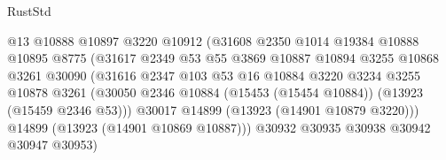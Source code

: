 \begin{lexlean}{RustStd}
\begin{coremodule}
                                        @13
                                        @10888
                                        @10897
                                        @3220
                                        @10912
                                        (@31608
                                          @2350
                                          @1014
                                          @19384
                                          @10888
                                          @10895
                                          @8775
                                          (@31617
                                            @2349
                                            @53
                                            @55
                                            @3869
                                            @10887
                                            @10894
                                            @3255
                                            @10868
                                            @3261
                                            @30090
                                            (@31616
                                              @2347
                                              @103
                                              @53
                                              @16
                                              @10884
                                              @3220
                                              @3234
                                              @3255
                                              @10878
                                              @3261
                                              (@30050
                                                @2346
                                                @10884
                                                (@15453 (@15454 @10884))
                                                (@13923 (@15459 @2346 @53)))
                                              @30017
                                              @14899
                                              (@13923 (@14901 @10879 @3220)))
                                            @14899
                                            (@13923 (@14901 @10869 @10887)))
                                          @30932
                                          @30935
                                          @30938
                                          @30942
                                          @30947
                                          @30953)

\end{coremodule}
\end{lexlean}
